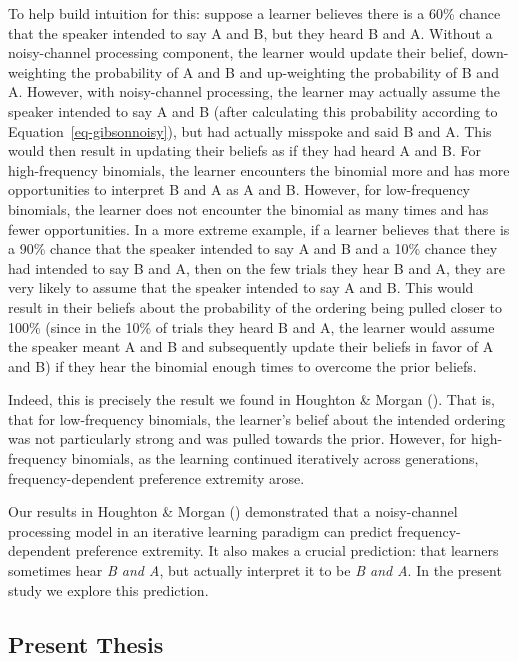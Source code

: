\documentclass[
  12pt,
]{scrartcl}
\begin{document}
To help build intuition for this: suppose a learner believes there is a
60\% chance that the speaker intended to say A and B, but they heard B
and A. Without a noisy-channel processing component, the learner would
update their belief, down-weighting the probability of A and B and
up-weighting the probability of B and A. However, with noisy-channel
processing, the learner may actually assume the speaker intended to say
A and B (after calculating this probability according to
Equation~\ref{eq-gibsonnoisy}), but had actually misspoke and said B and
A. This would then result in updating their beliefs as if they had heard
A and B. For high-frequency binomials, the learner encounters the
binomial more and has more opportunities to interpret B and A as A and
B. However, for low-frequency binomials, the learner does not encounter
the binomial as many times and has fewer opportunities. In a more
extreme example, if a learner believes that there is a 90\% chance that
the speaker intended to say A and B and a 10\% chance they had intended
to say B and A, then on the few trials they hear B and A, they are very
likely to assume that the speaker intended to say A and B. This would
result in their beliefs about the probability of the ordering being
pulled closer to 100\% (since in the 10\% of trials they heard B and A,
the learner would assume the speaker meant A and B and subsequently
update their beliefs in favor of A and B) if they hear the binomial
enough times to overcome the prior beliefs.

Indeed, this is precisely the result we found in Houghton \& Morgan
().
That is, that for low-frequency binomials, the learner's belief about
the intended ordering was not particularly strong and was pulled towards
the prior. However, for high-frequency binomials, as the learning
continued iteratively across generations, frequency-dependent preference
extremity arose.

Our results in Houghton \& Morgan
()
demonstrated that a noisy-channel processing model in an iterative
learning paradigm can predict frequency-dependent preference extremity.
It also makes a crucial prediction: that learners sometimes hear \emph{B
and A}, but actually interpret it to be \emph{B and A}. In the present
study we explore this prediction.

\subsection{Present Thesis}\label{present-thesis}
\end{document}
